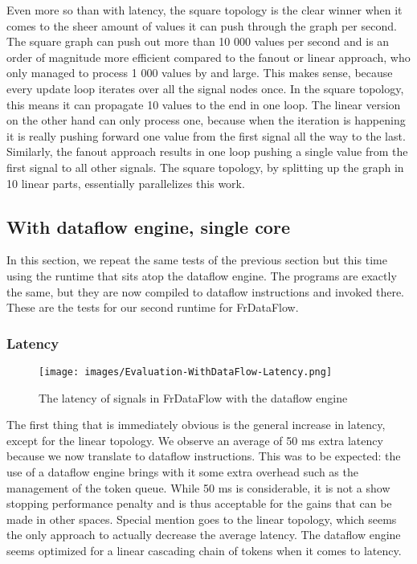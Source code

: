 Even more so than with latency, the square topology is the clear winner when it comes to the sheer amount of values it can push through the graph per second. The square graph can push out more than 10 000 values per second and is an order of magnitude more efficient compared to the fanout or linear approach, who only managed to process 1 000 values by and large. This makes sense, because every update loop iterates over all the signal nodes once. In the square topology, this means it can propagate 10 values to the end in one loop. The linear version on the other hand can only process one, because when the iteration is happening it is really pushing forward one value from the first signal all the way to the last. Similarly, the fanout approach results in one loop pushing a single value from the first signal to all other signals. The square topology, by splitting up the graph in 10 linear parts, essentially 
parallelizes this work. 

\newpage
\subsection{With dataflow engine, single core}

In this section, we repeat the same tests of the previous section but this time using the runtime that sits atop the dataflow engine. The programs are exactly the same, but they are now compiled to dataflow instructions and invoked there. These are the tests for our second runtime for FrDataFlow. 

\subsubsection{Latency}

\begin{figure}[h]
    \texttt{[image: images/Evaluation-WithDataFlow-Latency.png]}
	\caption{The latency of signals in FrDataFlow with the dataflow engine}
	\label{fig:evaluation-withdataflow-latency}
\end{figure}

The first thing that is immediately obvious is the general increase in latency, except for the linear topology. We observe an average of 50 ms extra latency because we now translate to dataflow instructions. This was to be expected: the use of a dataflow engine brings with it some extra overhead such as the management of the token queue. While 50 ms is considerable, it is not a show stopping performance penalty and is thus acceptable for the gains that can be made in other spaces. Special mention goes to the linear topology, which seems the only approach to actually decrease the average latency. The dataflow engine seems optimized for a linear cascading chain of tokens when it comes to latency.

